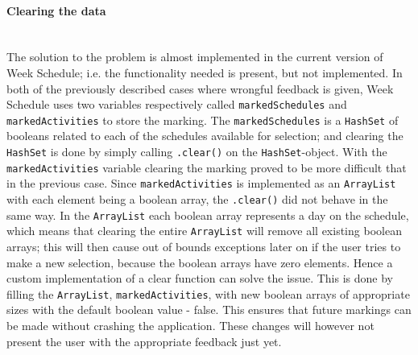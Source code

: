 \paragraph{Clearing the data}\hfill\\
The solution to the problem is almost implemented in the current version of Week Schedule; i.e. the functionality needed is present, but not implemented.
In both of the previously described cases where wrongful feedback is given, Week Schedule uses two variables respectively called \texttt{markedSchedules} and \texttt{markedActivities} to store the marking.
The \texttt{markedSchedules} is a \texttt{HashSet} of booleans related to each of the schedules available for selection; and clearing the \texttt{HashSet} is done by simply calling \texttt{.clear()} on the \texttt{HashSet}-object.
With the \texttt{markedActivities} variable clearing the marking proved to be more difficult that in the previous case.
Since \texttt{markedActivities} is implemented as an \texttt{ArrayList} with each element being a boolean array, the \texttt{.clear()} did not behave in the same way.
In the \texttt{ArrayList} each boolean array represents a day on the schedule, which means that clearing the entire \texttt{ArrayList} will remove all existing boolean arrays; this will then cause out of bounds exceptions later on if the user tries to make a new selection, because the boolean arrays have zero elements. 
Hence a custom implementation of a clear function can solve the issue.
This is done by filling the \texttt{ArrayList}, \texttt{markedActivities}, with new boolean arrays of appropriate sizes with the default boolean value - false.
This ensures that future markings can be made without crashing the application.
These changes will however not present the user with the appropriate feedback just yet.

